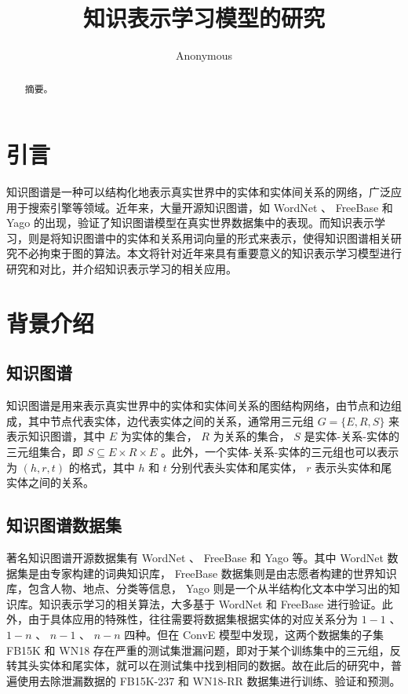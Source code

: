 \documentclass{llncs}
\begin{document}
\title{知识表示学习模型的研究}
\author{Anonymous}
\maketitle

\begin{abstract}

摘要。


\end{abstract}

\section{引言}

知识图谱是一种可以结构化地表示真实世界中的实体和实体间关系的网络，广泛应用于搜索引擎等领域。近年来，大量开源知识图谱，如 WordNet\cite{Miller:1995:WLD:219717.219748} 、 FreeBase\cite{Bollacker:2008:FCC:1376616.1376746} 和 Yago\cite{suchanek2007yago} 的出现，验证了知识图谱模型在真实世界数据集中的表现。而知识表示学习\cite{DBLP:journals/corr/abs-1812-10901}，则是将知识图谱中的实体和关系用词向量的形式来表示，使得知识图谱相关研究不必拘束于图的算法。本文将针对近年来具有重要意义的知识表示学习模型进行研究和对比，并介绍知识表示学习的相关应用。

\section{背景介绍}

\subsection{知识图谱}

知识图谱是用来表示真实世界中的实体和实体间关系的图结构网络，由节点和边组成，其中节点代表实体，边代表实体之间的关系，通常用三元组 $G=\{E,R,S\}$ 来表示知识图谱，其中 $E$ 为实体的集合， $R$ 为关系的集合， $S$ 是实体-关系-实体的三元组集合，即 $S\subseteq{E×R×E}$ 。此外，一个实体-关系-实体的三元组也可以表示为 $(h,r,t)$ 的格式，其中 $h$ 和 $t$ 分别代表头实体和尾实体， $r$ 表示头实体和尾实体之间的关系。

\subsection{知识图谱数据集}

著名知识图谱开源数据集有 WordNet 、 FreeBase 和 Yago 等。其中 WordNet 数据集是由专家构建的词典知识库， FreeBase 数据集则是由志愿者构建的世界知识库，包含人物、地点、分类等信息， Yago 则是一个从半结构化文本中学习出的知识库。知识表示学习的相关算法，大多基于 WordNet 和 FreeBase 进行验证。此外，由于具体应用的特殊性，往往需要将数据集根据实体的对应关系分为 $1-1$ 、 $1-n$ 、 $n-1$ 、 $n-n$ 四种。但在 ConvE 模型\cite{DBLP:conf/aaai/DettmersMS018}中发现，这两个数据集的子集 FB15K 和 WN18 存在严重的测试集泄漏问题，即对于某个训练集中的三元组，反转其头实体和尾实体，就可以在测试集中找到相同的数据。故在此后的研究中，普遍使用去除泄漏数据的 FB15K-237 和 WN18-RR 数据集进行训练、验证和预测。
\end{document}
